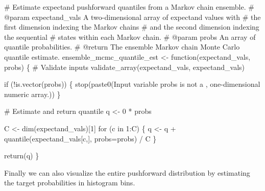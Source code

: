 \documentclass[
  letterpaper,
  DIV=11,
  numbers=noendperiod]{scrartcl}
\newenvironment{Shaded}{\begin{snugshade}}{\end{snugshade}}
\newcommand{\CommentTok}[1]{\textcolor[rgb]{0.37,0.37,0.37}{#1}}
\newcommand{\ControlFlowTok}[1]{\textcolor[rgb]{0.00,0.23,0.31}{#1}}
\newcommand{\DecValTok}[1]{\textcolor[rgb]{0.68,0.00,0.00}{#1}}
\newcommand{\KeywordTok}[1]{\textcolor[rgb]{0.00,0.23,0.31}{#1}}
\newcommand{\NormalTok}[1]{\textcolor[rgb]{0.00,0.23,0.31}{#1}}
\newcommand{\OperatorTok}[1]{\textcolor[rgb]{0.37,0.37,0.37}{#1}}
\newcommand{\StringTok}[1]{\textcolor[rgb]{0.13,0.47,0.30}{#1}}
\begin{document}
\begin{Shaded}
\begin{Highlighting}[]
\CommentTok{\# Estimate expectand pushforward quantiles from a Markov chain ensemble.}
\CommentTok{\# @param expectand\_vals A two{-}dimensional array of expectand values with}
\CommentTok{\#                       the first dimension indexing the Markov chains}
\CommentTok{\#                       and the second dimension indexing the sequential}
\CommentTok{\#                       states within each Markov chain.}
\CommentTok{\# @param probs An array of quantile probabilities.}
\CommentTok{\# @return The ensemble Markov chain Monte Carlo quantile estimate.}
\NormalTok{ensemble\_mcmc\_quantile\_est }\OperatorTok{\textless{}{-}}\NormalTok{ function(expectand\_vals, probs) \{}
  \CommentTok{\# Validate inputs}
\NormalTok{  validate\_array(expectand\_vals, }\StringTok{\textquotesingle{}expectand\_vals\textquotesingle{}}\NormalTok{)}

  \ControlFlowTok{if}\NormalTok{ (}\OperatorTok{!}\KeywordTok{is}\NormalTok{.vector(probs)) \{}
\NormalTok{    stop(paste0(}\StringTok{\textquotesingle{}Input variable \textasciigrave{}probs\textasciigrave{} is not a \textquotesingle{}}\NormalTok{,}
                \StringTok{\textquotesingle{}one{-}dimensional numeric array.\textquotesingle{}}\NormalTok{))}
\NormalTok{  \}}

  \CommentTok{\# Estimate and return quantile}
\NormalTok{  q }\OperatorTok{\textless{}{-}} \DecValTok{0} \OperatorTok{*}\NormalTok{ probs}

\NormalTok{  C }\OperatorTok{\textless{}{-}}\NormalTok{ dim(expectand\_vals)[}\DecValTok{1}\NormalTok{]}
  \ControlFlowTok{for}\NormalTok{ (c }\KeywordTok{in} \DecValTok{1}\NormalTok{:C) \{}
\NormalTok{    q }\OperatorTok{\textless{}{-}}\NormalTok{ q }\OperatorTok{+}\NormalTok{ quantile(expectand\_vals[c,], probs}\OperatorTok{=}\NormalTok{probs) }\OperatorTok{/}\NormalTok{ C}
\NormalTok{  \}}

  \ControlFlowTok{return}\NormalTok{(q)}
\NormalTok{\}}
\end{Highlighting}
\end{Shaded}

Finally we can also visualize the entire pushforward distribution by
estimating the target probabilities in histogram bins.
\end{document}
